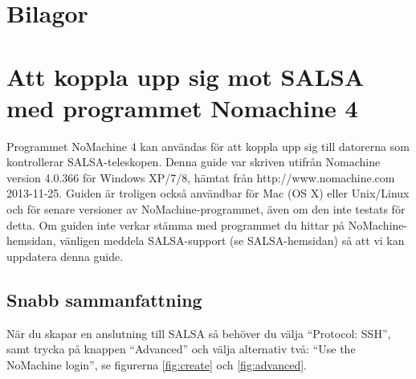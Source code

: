 \chapter*{Bilagor}
\appendix

\chapter{Att koppla upp sig mot SALSA med programmet Nomachine 4}
\label{app:nomachine}
Programmet NoMachine 4 kan användas för att koppla upp sig till datorerna som
kontrollerar SALSA-teleskopen. Denna guide var skriven utifrån Nomachine
version 4.0.366 för Windows XP/7/8, hämtat från http://www.nomachine.com
2013-11-25.  Guiden är troligen också användbar för Mac (OS X) eller Unix/Linux
och för senare versioner av NoMachine-programmet, även om den inte testats för
detta. Om guiden inte verkar stämma med programmet du hittar på
NoMachine-hemsidan, vänligen meddela SALSA-support (se SALSA-hemsidan) så att
vi kan uppdatera denna guide.

\section{Snabb sammanfattning}
När du skapar en anslutning till SALSA så behöver du välja ``Protocol: SSH'',
samt trycka på knappen ``Advanced'' och välja alternativ två: ``Use the NoMachine
login'', se figurerna \ref{fig:create} och \ref{fig:advanced}. 

